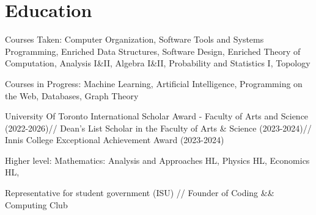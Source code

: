 \documentclass[letterpaper,10pt]{article}
\begin{document}

    \section{Education}

        \begin{resume_list}
            \item Courses Taken: Computer Organization, Software Tools and Systems Programming, Enriched Data Structures, Software Design, Enriched Theory of Computation, %
            Analysis I\&II, Algebra I\&II, Probability and Statistics I, Topology
            \item Courses in Progress: Machine Learning, Artificial Intelligence, Programming on the Web, Databases, Graph Theory
            \item University Of Toronto International Scholar Award - Faculty of Arts and Science (2022-2026)//
            Dean’s List Scholar in the Faculty of Arts \& Science (2023-2024)//
            Innis College Exceptional Achievement Award (2023-2024)
        \end{resume_list}
    \vspace{5pt} 
    \begin{resume_list}
        \item Higher level: Mathematics: Analysis and Approaches HL, 
        Physics HL, Economics HL, 
        \item Representative for student government (ISU) // Founder of Coding \&\& Computing Club
    \end{resume_list}


\end{document}
